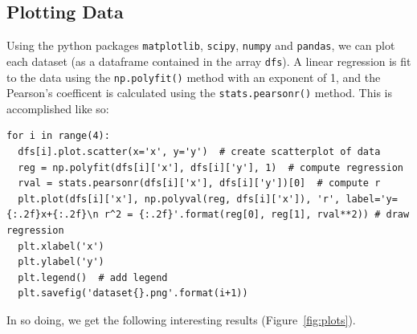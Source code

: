 \documentclass[11pt,a4paper]{article}
\begin{document}
\subsection{Plotting Data}

Using the python packages \texttt{matplotlib}, \texttt{scipy}, \texttt{numpy} and \texttt{pandas}, we can plot each dataset (as a dataframe contained in the array \texttt{dfs}). A linear regression is fit to the data using the \texttt{np.polyfit()} method with an exponent of 1, and the Pearson's coefficent is calculated using the \texttt{stats.pearsonr()} method. This is accomplished like so:

\begin{lstlisting}
for i in range(4):
  dfs[i].plot.scatter(x='x', y='y')  # create scatterplot of data
  reg = np.polyfit(dfs[i]['x'], dfs[i]['y'], 1)  # compute regression
  rval = stats.pearsonr(dfs[i]['x'], dfs[i]['y'])[0]  # compute r
  plt.plot(dfs[i]['x'], np.polyval(reg, dfs[i]['x']), 'r', label='y={:.2f}x+{:.2f}\n r^2 = {:.2f}'.format(reg[0], reg[1], rval**2)) # draw regression
  plt.xlabel('x')
  plt.ylabel('y')
  plt.legend()  # add legend
  plt.savefig('dataset{}.png'.format(i+1))
\end{lstlisting}

In so doing, we get the following interesting results (Figure~\ref{fig:plots}).
\end{document}
